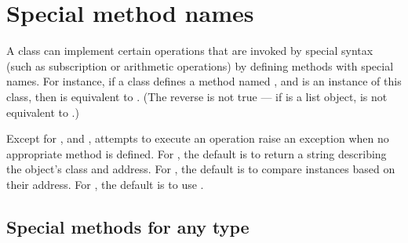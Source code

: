\section{Special method names} \label{specialnames}

A class can implement certain operations that are invoked by special
syntax (such as subscription or arithmetic operations) by defining
methods with special names.  For instance, if a class defines a
method named , and  is an instance of this
class, then  is equivalent to .
(The reverse is not true --- if  is a list object,
 is not equivalent to .)

Except for ,  and ,
attempts to execute an
operation raise an exception when no appropriate method is defined.
For , the default is to return a string describing the
object's class and address.
For , the default is to compare instances based on their
address.
For , the default is to use .


\subsection{Special methods for any type}

